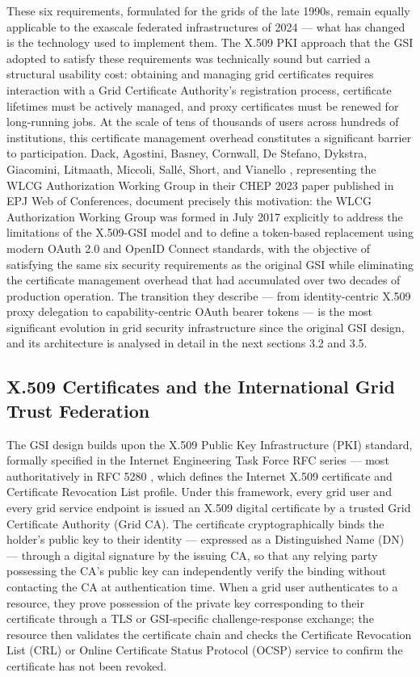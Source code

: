 \documentclass[12pt,a4paper]{report}
\begin{document}
      These six requirements,
       formulated for the grids of the late 1990s, remain equally applicable to the exascale federated infrastructures of 2024 — what has changed is the 
       technology used to implement them. The X.509 PKI approach that the GSI adopted to satisfy these requirements was technically sound but carried a 
       structural usability cost: obtaining and managing grid certificates requires interaction with a Grid Certificate Authority’s registration process, 
       certificate lifetimes must be actively managed, and proxy certificates must be renewed for long-running jobs. At the scale of tens of thousands of
        users across hundreds of institutions, this certificate management overhead constitutes a significant barrier to participation. Dack, Agostini, 
        Basney, Cornwall, De Stefano, Dykstra, Giacomini, Litmaath, Miccoli, Sallé, Short, and Vianello \parencite{dack2024wlcg}, representing the WLCG Authorization Working
         Group in their CHEP 2023 paper published in EPJ Web of Conferences, document precisely this motivation: the WLCG Authorization Working Group was 
         formed in July 2017 explicitly to address the limitations of the X.509-GSI model and to define a token-based replacement using modern OAuth 2.0 
         and OpenID Connect standards, with the objective of satisfying the same six security requirements as the original GSI while eliminating the
          certificate management overhead that had accumulated over two decades of production operation. The transition they describe — from 
          identity-centric X.509 proxy delegation to capability-centric OAuth bearer tokens — is the most significant evolution in grid security 
          infrastructure since the original GSI design, and its architecture is analysed in detail in the next sections 3.2 and 3.5.

\subsection*{X.509 Certificates and the International Grid Trust Federation}
The GSI design builds upon the X.509 Public Key Infrastructure (PKI) standard, formally specified in the Internet Engineering Task Force RFC
 series — most authoritatively in RFC 5280 \parencite{rfc5280}, which defines the Internet X.509
  certificate and Certificate Revocation List profile. Under this framework, every grid user and every grid service endpoint is issued 
  an X.509 digital certificate by a trusted Grid Certificate Authority (Grid CA). The certificate cryptographically binds the holder’s 
  public key to their identity — expressed as a Distinguished Name (DN) — through a digital signature by the issuing CA, so that any relying 
  party possessing the CA’s public key can independently verify the binding without contacting the CA at authentication time. When a grid user
   authenticates to a resource, they prove possession of the private key corresponding to their certificate through a TLS or GSI-specific 
   challenge-response exchange; the resource then validates the certificate chain and checks the Certificate Revocation List (CRL) or Online 
   Certificate Status Protocol (OCSP) service to confirm the certificate has not been revoked. 
\end{document}
